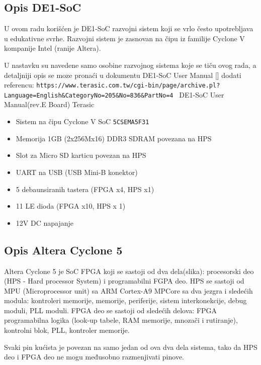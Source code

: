 \subsection{Opis DE1-SoC}

U ovom radu korišćen je DE1-SoC razvojni sistem koji se vrlo često upotrebljava u edukativne svrhe. Razvojni sistem je zasnovan na čipu iz familije Cyclone V kompanije Intel (ranije Altera).

U nastavku su navedene samo osobine razvojnog sistema koje se tiču ovog rada, a detaljniji opis se moze pronaći u dokumentu DE1-SoC User Manual []
dodati referencu: \verb+https://www.terasic.com.tw/cgi-bin/page/archive.pl?Language=English&CategoryNo=205&No=836&PartNo=4 +
DE1-SoC User Manual(rev.E Board)
Terasic
\begin{itemize}
\item Sistem na čipu Cyclone V SoC \texttt{5CSEMA5F31}
\item Memorija 1GB (2x256Mx16) DDR3 SDRAM povezana na HPS
\item Slot za Micro SD karticu povezan na HPS
\item UART na USB (USB Mini-B konektor)
\item 5 debaunsiranih tastera (FPGA x4, HPS x1)
\item 11 LE dioda (FPGA x10, HPS x 1)
\item 12V DC napajanje
\end{itemize}

\subsection{Opis Altera Cyclone 5}
Altera Cyclone 5 je SoC FPGA koji se sastoji od dva dela(slika): procesorski deo (HPS -  Hard processor System) i programabilni FGPA deo. HPS se sastoji od MPU (Microprocessor unit) sa ARM Cortex-A9 MPCore sa dva jezgra i sledećih modula: kontroleri memorije, memorije, periferije, sistem interkonekcije, debug moduli, PLL moduli. FPGA deo se sastoji od sledećih delova: FPGA programabilna logika (look-up tabele, RAM memorije, mnozači i rutiranje), kontrolni blok, PLL, kontroler memorije.

Svaki pin kućista je povezan na samo jedan od ova dva dela sistema, tako da HPS deo i FPGA deo ne mogu međusobno razmenjivati pinove.

